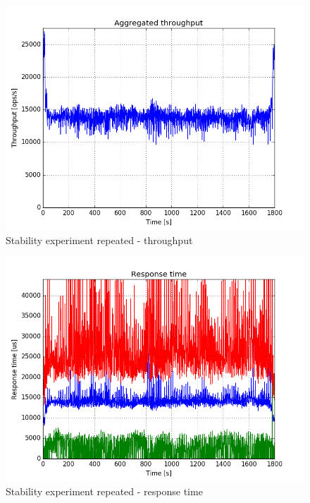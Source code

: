 \documentclass[11pt]{article}
\begin{document}
\begin{figure}
\centering
\includegraphics[width=0.95\linewidth]{plots/mm1_throughput}
\caption{Stability experiment repeated - throughput}
\label{fig:mm1-throughput}
\end{figure}

\begin{figure}
\centering
\includegraphics[width=0.95\linewidth]{plots/mm1_response_time}
\caption{Stability experiment repeated - response time}
\label{fig:mm1-response-time}
\end{figure}
\end{document}
